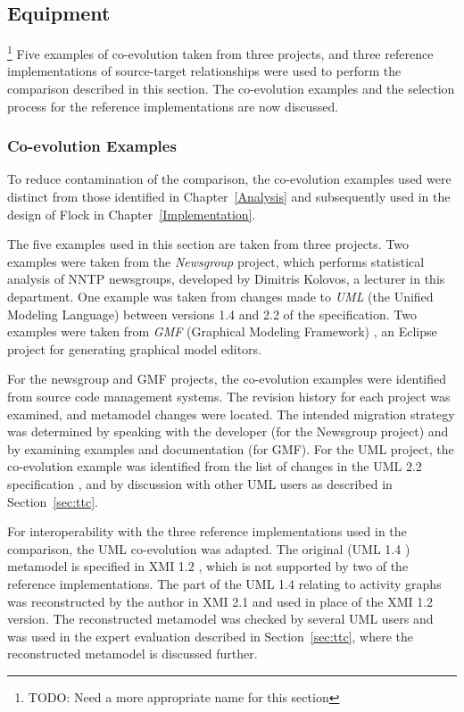 \subsection{Equipment}\footnote{TODO: Need a more appropriate name for this section}
\label{subsec:quantitive_equipment}
Five examples of co-evolution taken from three projects, and three reference implementations of source-target relationships were used to perform the comparison described in this section. The co-evolution examples and the selection process for the reference implementations are now discussed.

\subsubsection{Co-evolution Examples}
To reduce contamination of the comparison, the co-evolution examples used were distinct from those identified in Chapter~\ref{Analysis} and subsequently used in the design of Flock in Chapter~\ref{Implementation}.

The five examples used in this section are taken from three projects. Two examples were taken from the \emph{Newsgroup} project, which performs statistical analysis of NNTP newsgroups, developed by Dimitris Kolovos, a lecturer in this department. One example was taken from changes made to \emph{UML} (the Unified Modeling Language) between versions 1.4 \cite{uml14} and 2.2 \cite{uml22} of the specification. Two examples were taken from \emph{GMF} (Graphical Modeling Framework) \cite{gronback09emp}, an Eclipse project for generating graphical model editors.

For the newsgroup and GMF projects, the co-evolution examples were identified from source code management systems. The revision history for each project was examined, and metamodel changes were located. The intended migration strategy was determined by speaking with the developer (for the Newsgroup project) and by examining examples and documentation (for GMF). For the UML project, the co-evolution example was identified from the list of changes in the UML 2.2 specification \cite{uml22}, and by discussion with other UML users as described in Section~\ref{sec:ttc}.

For interoperability with the three reference implementations used in the comparison, the UML co-evolution was adapted. The original (UML 1.4 \cite{uml14}) metamodel is specified in XMI 1.2 \cite{xmi}, which is not supported by two of the reference implementations. The part of the UML 1.4 relating to activity graphs was reconstructed by the author in XMI 2.1 and used in place of the XMI 1.2 version. The reconstructed metamodel was checked by several UML users and was used in the expert evaluation described in Section~\ref{sec:ttc}, where the reconstructed metamodel is discussed further. 


